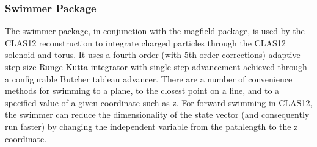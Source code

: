 \subsubsection{Swimmer Package}
The swimmer package, in conjunction with the magfield package, is used by the CLAS12
reconstruction to integrate charged particles through the CLAS12 solenoid and torus.
It uses a fourth order (with 5th order corrections) adaptive step-size Runge-Kutta integrator
with single-step advancement achieved through a configurable Butcher tableau advancer.
There are a number of convenience methods for swimming to a plane, to the closest
point on a line, and to a specified value of a given coordinate such as z. For
forward swimming in CLAS12, the swimmer can reduce the dimensionality of the state
vector (and consequently run faster) by changing the independent variable from
the pathlength to the z coordinate.

